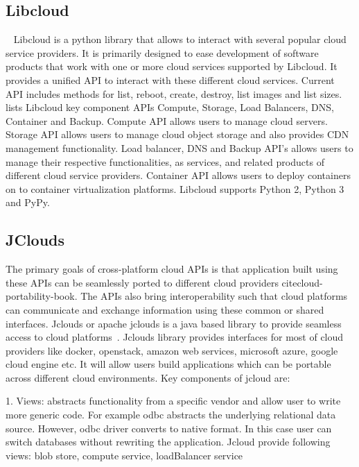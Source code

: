      \pv
     
\subsection{Libcloud}

    ~\cite{www-libcloudwiki} Libcloud is a python library that
     allows to interact with several popular cloud service
     providers. It is primarily designed to ease development of
     software products that work with one or more cloud services
     supported by Libcloud. It provides a unified API to interact with
     these different cloud services. Current API includes methods for
     list, reboot, create, destroy, list images and list
     sizes.~\cite{www-libclouddoc} lists Libcloud key component APIs
     Compute, Storage, Load Balancers, DNS, Container and
     Backup. Compute API allows users to manage cloud servers. Storage
     API allows users to manage cloud object storage and also provides
     CDN management functionality. Load balancer, DNS and Backup API's
     allows users to manage their respective functionalities, as
     services, and related products of different cloud service
     providers. Container API allows users to deploy containers on to
     container virtualization platforms. Libcloud supports Python 2,
     Python 3 and PyPy.

     \pv
     
\subsection{JClouds}

The primary goals of cross-platform cloud APIs is that application
built using these APIs can be seamlessly ported to different cloud
providers cite{cloud-portability-book}.  The APIs also bring
interoperability such that cloud platforms can communicate and
exchange information using these common or shared interfaces.  Jclouds
or apache jclouds is a java based library to provide seamless access
to cloud platforms~\cite{www-jclouds}.  Jclouds library provides
interfaces for most of cloud providers like docker, openstack, amazon
web services, microsoft azure, google cloud engine etc. It will allow
users build applications which can be portable across different cloud
environments.  Key components of jcloud are:

     1. Views: abstracts functionality from a specific vendor and
        allow user to write more generic code. For example odbc
        abstracts the underlying relational data source. However, odbc
        driver converts to native format. In this case user can switch
        databases without rewriting the application. Jcloud provide
        following views: blob store, compute service, loadBalancer
        service

